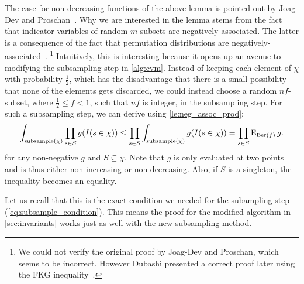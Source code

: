 The case for non-decreasing functions of the above lemma is pointed out by Joag-Dev and Proschan~\cite[P.2]{joagdev1983}.
Why we are interested in the lemma stems from the fact that indicator variables of random $m$-subsets are negatively associated.
The latter is a consequence of the fact that permutation distributions are negatively-associated~\cite[Th. 2.11]{joagdev1983}.%
\footnote{We could not verify the original proof by Joag-Dev and Proschan, which seems to be incorrect.
However Dubashi presented a correct proof later using the FKG inequality~\cite[Th. 10]{dubhashi1996}.}
Intuitively, this is interesting because it opens up an avenue to modifying the subsampling step in \cref{alg:cvm}.
Instead of keeping each element of $\chi$ with probability $\frac{1}{2}$, which has the disadvantage that there is a small possibility that none of the elements gets discarded, we could instead choose a random $nf$-subset, where $\frac{1}{2} \leq f < 1$, such that $nf$ is integer, in the subsampling step.
For such a subsampling step, we can derive using \cref{le:neg_assoc_prod}:
\begin{equation}\label{eq:subsample_with_n_subsets}
  \int_{\mathrm{subsample}(\chi)} \prod_{s \in S} g(I(s \in \chi)) \leq \prod_{s \in S} \int_{\mathrm{subsample}(\chi)} g(I(s \in \chi)) = \prod_{s \in S}  \operatorname{\mathrm{E}}_{\operatorname{\mathrm{Ber}}(f)} g \textrm{.}
\end{equation}
for any non-negative $g$ and $S \subseteq \chi$. Note that $g$ is only evaluated at two points and is thus either non-increasing or non-decreasing.
Also, if $S$ is a singleton, the inequality becomes an equality.

Let us recall that this is the exact condition we needed for the subampling step (\cref{eq:subsample_condition}).
This means the proof for the modified algorithm in \cref{sec:invariants} works just as well with the new subsampling method.

